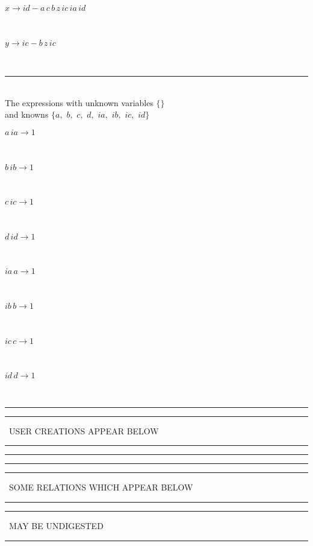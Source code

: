 \documentclass[rep10,leqno]{report}
\begin{document}
\begin{minipage}{6in}
$
x\rightarrow id - a\,
 c\,
 b\,
 z\,
 ic\,
 ia\,
 id
$
\end{minipage}\medskip\\
\begin{minipage}{6in}
$
y\rightarrow ic - b\,
 z\,
 ic
$
\end{minipage}\medskip\\
\rule[3pt]{6in}{.7pt}\\
The expressions with unknown variables $\{\}$\\
and knowns $\{a,
$ $
b,
$ $
c,
$ $
d,
$ $
ia,
$ $
ib,
$ $
ic,
$ $
id\}$\smallskip\\
\begin{minipage}{6in}
$
a\,
 ia\rightarrow 1
$
\end{minipage}\medskip \\
\begin{minipage}{6in}
$
b\,
 ib\rightarrow 1
$
\end{minipage}\medskip \\
\begin{minipage}{6in}
$
c\,
 ic\rightarrow 1
$
\end{minipage}\medskip \\
\begin{minipage}{6in}
$
d\,
 id\rightarrow 1
$
\end{minipage}\medskip \\
\begin{minipage}{6in}
$
ia\,
 a\rightarrow 1
$
\end{minipage}\medskip \\
\begin{minipage}{6in}
$
ib\,
 b\rightarrow 1
$
\end{minipage}\medskip \\
\begin{minipage}{6in}
$
ic\,
 c\rightarrow 1
$
\end{minipage}\medskip \\
\begin{minipage}{6in}
$
id\,
 d\rightarrow 1
$
\end{minipage}\\
\rule[2pt]{6in}{1pt}\hfil\break
\rule[2.5pt]{1.701in}{1pt}
\ USER CREATIONS APPEAR BELOW\ 
\rule[2.5pt]{1.701in}{1pt}\hfil\break
\rule[2pt]{6in}{1pt}\hfil\break
\rule[2pt]{6in}{4pt}\hfil\break
\rule[2pt]{1.45in}{4pt}
\ SOME RELATIONS WHICH APPEAR BELOW\ 
\rule[2pt]{1.45in}{4pt}\hfil\break
\rule[2pt]{2.18in}{4pt}
\ MAY BE UNDIGESTED\ 
\rule[2pt]{2.18in}{4pt}\hfil\break
\end{document}
